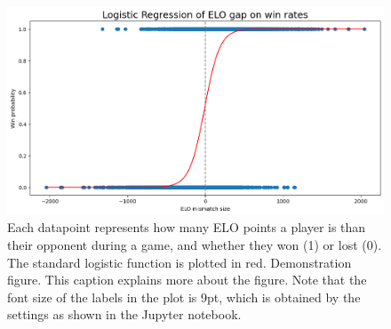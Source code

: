 \documentclass[10pt,a4paper,twocolumn]{article}
\begin{document}
\begin{figure}[t]
  \centering
  \includegraphics{report/images/log_regression.png}
  \caption{Each datapoint represents how many ELO points a player is than their opponent during a game, and whether they won (1) or lost (0). The standard logistic function is plotted in red.
  Demonstration figure. This caption explains more about the figure. Note that the font size of the labels in the plot is 9pt, which is obtained by the settings as shown in the Jupyter notebook.}
  \label{fds-project-template:fig:log_regression}
\end{figure}



\end{document}
